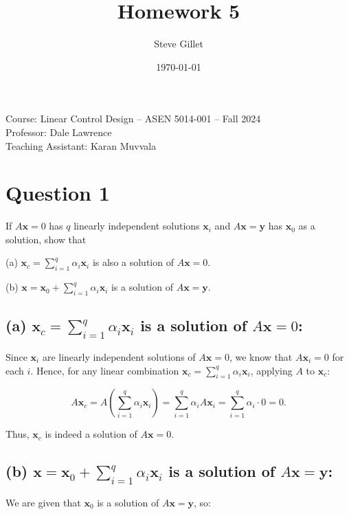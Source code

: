 \documentclass{article}
\title{Homework 5}
\author{Steve Gillet}
\date{\today}
\newcommand{\className}{Course: Linear Control Design – ASEN 5014-001 – Fall 2024}
\newcommand{\professorName}{Professor: Dale Lawrence}
\newcommand{\taName}{Teaching Assistant: Karan Muvvala}
\begin{document}
\maketitle
\begin{center}
    \large{\className} \\
    \large{\professorName} \\
    \large{\taName}
\end{center}

\section{Question 1}
If \( A \mathbf{x} = 0 \) has \( q \) linearly independent solutions \( \mathbf{x}_i \) and \( A \mathbf{x} = \mathbf{y} \) has \( \mathbf{x}_0 \) as a solution, show that

(a) \( \mathbf{x}_c = \sum_{i=1}^{q} \alpha_i \mathbf{x}_i \) is also a solution of \( A \mathbf{x} = 0 \).

(b) \( \mathbf{x} = \mathbf{x}_0 + \sum_{i=1}^{q} \alpha_i \mathbf{x}_i \) is a solution of \( A \mathbf{x} = \mathbf{y} \).

\subsection{(a) \( \mathbf{x}_c = \sum_{i=1}^{q} \alpha_i \mathbf{x}_i \) is a solution of \( A \mathbf{x} = 0 \):}

Since \( \mathbf{x}_i \) are linearly independent solutions of \( A \mathbf{x} = 0 \), we know that \( A \mathbf{x}_i = 0 \) for each \( i \). Hence, for any linear combination \( \mathbf{x}_c = \sum_{i=1}^{q} \alpha_i \mathbf{x}_i \), applying \( A \) to \( \mathbf{x}_c \):

\[
A \mathbf{x}_c = A \left( \sum_{i=1}^{q} \alpha_i \mathbf{x}_i \right) = \sum_{i=1}^{q} \alpha_i A \mathbf{x}_i = \sum_{i=1}^{q} \alpha_i \cdot 0 = 0.
\]

Thus, \( \mathbf{x}_c \) is indeed a solution of \( A \mathbf{x} = 0 \).

\subsection{(b) \( \mathbf{x} = \mathbf{x}_0 + \sum_{i=1}^{q} \alpha_i \mathbf{x}_i \) is a solution of \( A \mathbf{x} = \mathbf{y} \):}

We are given that \( \mathbf{x}_0 \) is a solution of \( A \mathbf{x} = \mathbf{y} \), so:
\end{document}
